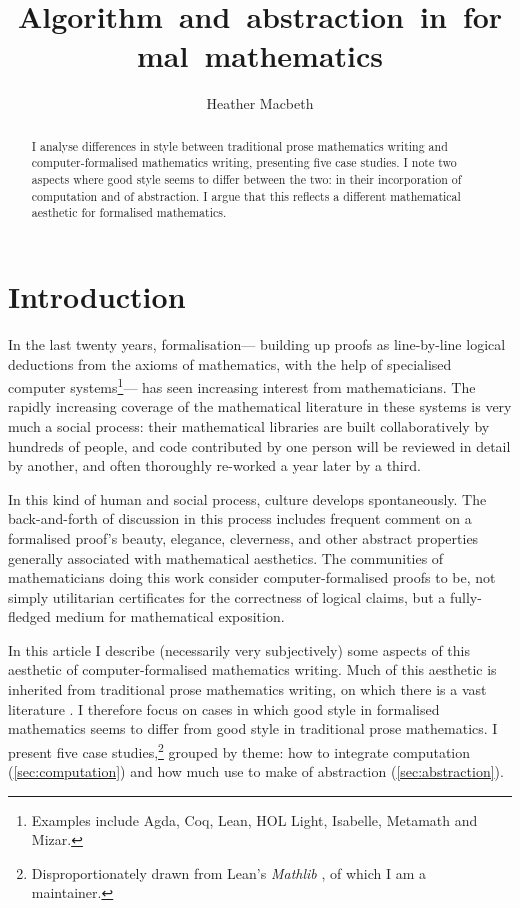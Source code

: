 \documentclass[12pt]{llncs}
\begin{document}
%
\title{Algorithm~and~abstraction~in~formal~mathematics}

\author{Heather Macbeth}

%
\maketitle
%
\begin{abstract}
  I analyse differences in style between traditional prose mathematics writing and computer-formalised mathematics writing,
  presenting five case studies.
  I note two aspects where good style seems to differ between the two: in
  their incorporation of computation and of abstraction.
  I argue that this reflects a different mathematical aesthetic for formalised mathematics.
\end{abstract}
%
%
%
\setcounter{tocdepth}{3}

\section{Introduction}

In the last twenty years, formalisation---%
building up proofs as line-by-line logical deductions from the axioms of mathematics, with the help of specialised computer systems\footnote{
  Examples include Agda, Coq, Lean, HOL Light, Isabelle, Metamath and Mizar.}---%
has seen increasing interest from mathematicians. 
The rapidly increasing coverage of the mathematical literature in these systems
is very much a social process:
their mathematical libraries are built collaboratively by hundreds of people,
and code contributed by one person will be reviewed in detail by another,
and often thoroughly re-worked a year later by a third.

In this kind of human and social process, culture develops spontaneously.
The back-and-forth of discussion in this process includes frequent comment
on a formalised proof's beauty, elegance, cleverness,
and other abstract properties generally associated with mathematical aesthetics.
The communities of mathematicians doing this work
consider computer-formalised proofs to be,
not simply utilitarian certificates for the correctness of logical claims,
but a fully-fledged medium for mathematical exposition.

In this article I describe
(necessarily very subjectively)
some aspects of this aesthetic of computer-formalised mathematics writing.
Much of this aesthetic is inherited from traditional prose mathematics writing,
on which there is a vast literature \cite{Arn98,Bon82,Hal70,Har40,IA14,Mon12,Rot97,Tao07,Wel90}.
I therefore focus on cases in which good style in formalised mathematics
seems to differ from good style in traditional prose mathematics.
I present five case studies,\footnote{
Disproportionately drawn from Lean's \cite{Lean3,Lean4} 
\emph{Mathlib} \cite{Mathlib},
of which I am a maintainer.}
grouped by theme:
how to integrate computation (\cref{sec:computation})
and how much use to make of abstraction (\cref{sec:abstraction}).
\end{document}
